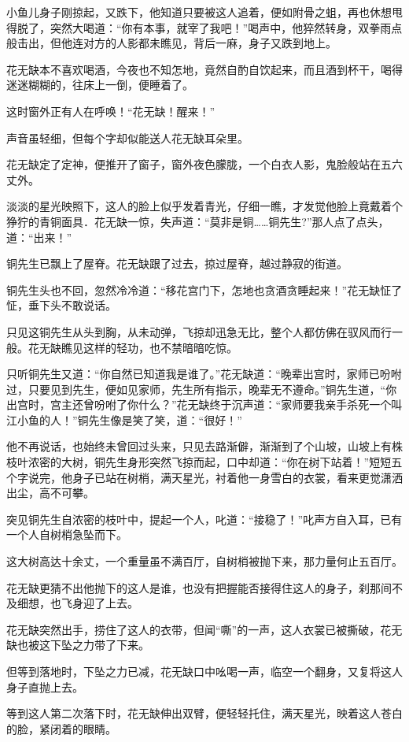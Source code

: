 \documentclass[12pt,oneside]{book}
\begin{document}
小鱼儿身子刚掠起，又跌下，他知道只要被这人追着，便如附骨之蛆，再也休想甩得脱了，突然大喝道：``你有本事，就宰了我吧！''喝声中，他猝然转身，双拳雨点般击出，但他连对方的人影都未瞧见，背后一麻，身子又跌到地上。

花无缺本不喜欢喝酒，今夜也不知怎地，竟然自酌自饮起来，而且酒到杯干，喝得迷迷糊糊的，往床上一倒，便睡着了。

这时窗外正有人在呼唤！``花无缺！醒来！''

声音虽轻细，但每个字却似能送人花无缺耳朵里。

花无缺定了定神，便推开了窗子，窗外夜色朦胧，一个白衣人影，鬼脸般站在五六丈外。

淡淡的星光映照下，这人的脸上似乎发着青光，仔细一瞧，才发觉他脸上竟戴着个狰狞的青铜面具．花无缺一惊，失声道：``莫非是铜\ldots\ldots 铜先生?''那人点了点头，道：``出来！''

铜先生已飘上了屋脊。花无缺跟了过去，掠过屋脊，越过静寂的街道。

铜先生头也不回，忽然冷冷道：``移花宫门下，怎地也贪酒贪睡起来！''花无缺怔了怔，垂下头不敢说话。

只见这铜先生从头到胸，从未动弹，飞掠却迅急无比，整个人都仿佛在驭风而行一般。花无缺瞧见这样的轻功，也不禁暗暗吃惊。

只听铜先生又道：``你自然已知道我是谁了。''花无缺道：``晚辈出宫时，家师已吩咐过，只要见到先生，便如见家师，先生所有指示，晚辈无不遵命。''铜先生道，``你出宫时，宫主还曾吩咐了你什么？''花无缺终于沉声道：``家师要我亲手杀死一个叫江小鱼的人！''铜先生像是笑了笑，道：``很好！''

他不再说话，也始终未曾回过头来，只见去路渐僻，渐渐到了个山坡，山坡上有株枝叶浓密的大树，铜先生身形突然飞掠而起，口中却道：``你在树下站着！''短短五个字说完，他身子已站在树梢，满天星光，衬着他一身雪白的衣裳，看来更觉潇洒出尘，高不可攀。

突见铜先生自浓密的枝叶中，提起一个人，叱道：``接稳了！''叱声方自入耳，已有一个人自树梢急坠而下。

这大树高达十余丈，一个重量虽不满百厅，自树梢被抛下来，那力量何止五百厅。

花无缺更猜不出他抛下的这人是谁，也没有把握能否接得住这人的身子，刹那间不及细想，也飞身迎了上去。

花无缺突然出手，捞住了这人的衣带，但闻``嘶''的一声，这人衣裳已被撕破，花无缺也被这下坠之力带了下来。

但等到落地时，下坠之力已减，花无缺口中吆喝一声，临空一个翻身，又复将这人身子直抛上去。

等到这人第二次落下时，花无缺伸出双臂，便轻轻托住，满天星光，映着这人苍白的脸，紧闭着的眼睛。
\end{document}
